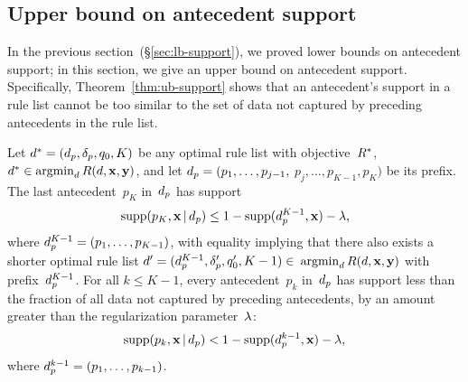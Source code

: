 \begin{arxiv}
\subsection{Upper bound on antecedent support}
\label{sec:ub-support}

In the previous section~(\S\ref{sec:lb-support}), we proved lower bounds
on antecedent support; in this section, we give an upper bound on
antecedent support.
%
Specifically, Theorem~\ref{thm:ub-support} shows that an antecedent's
support in a rule list cannot be too similar to the set of data not
captured by preceding antecedents in the rule list.

\begin{theorem}
\label{thm:ub-support}
Let ${d^* = (d_p, \delta_p, q_0, K)}$
be any optimal rule list with objective~$R^*$, \ie
${d^* \in \operatorname*{argmin}_{d} R({d}, \mathbf{x}, \mathbf{y})}$,
and let ${d_p = (p_1, \dots, p_{j-1},}$
${p_j, \dots, p_{K-1}, p_K)}$ be its prefix.
%
The last antecedent~$p_K$ in~$d_p$ has support
\begin{align}
\textnormal{supp}(p_K, \mathbf{x} \,|\, d_p) \le 1 - \textnormal{supp}(d_p^{K-1}, \mathbf{x}) - {\lambda},
\label{eq:ub-support-last}
\end{align}
where ${d_p^{K-1} = (p_1, \dots, p_{K-1})}$,
with equality implying that there also exists a shorter optimal rule list
${{d}' = (d_p^{K-1}, \delta_p', q_0', K - 1) \in}$ ${\operatorname*{argmin}_{d} R({d}, \mathbf{x}, \mathbf{y})}$
with prefix~$d_p^{K-1}$.
%
For all ${k \le K - 1}$, every antecedent~$p_k$ in~$d_p$ has support
less than the fraction of all data not captured by preceding antecedents,
by an amount greater than the regularization parameter~${\lambda}$:
\begin{align}
\textnormal{supp}(p_k, \mathbf{x} \,|\, d_p) < 1 - \textnormal{supp}(d_p^{k-1}, \mathbf{x}) - {\lambda},
\label{eq:ub-support}
\end{align}
where ${d_p^{k-1} = (p_1, \dots, p_{k-1})}$.
\end{theorem}


\end{arxiv}
